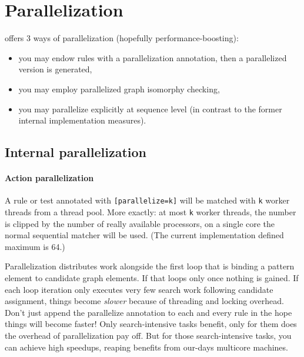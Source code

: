 \chapter{Parallelization}\label{cha:parallel} 

\GrG{} offers 3 ways of parallelization (hopefully performance-boosting):

\begin{itemize}
	\item you may endow rules with a parallelization annotation, then a parallelized version is generated, 
	\item you may employ parallelized graph isomorphy checking, 
	\item you may parallelize explicitly at sequence level (in contrast to the former internal implementation measures).
\end{itemize}


\section{Internal parallelization}\label{sec:internalparallelization}

\subsubsection*{Action parallelization}

A rule or test annotated with \texttt{[parallelize=k]} will be matched with \texttt{k} worker threads from a thread pool.
More exactly: at most \texttt{k} worker threads, the number is clipped by the number of really available processors, on a single core the normal sequential matcher will be used.
(The current implementation defined maximum is 64.)

Parallelization distributes work alongside the first loop that is binding a pattern element to candidate graph elements.
If that loops only once nothing is gained.
If each loop iteration only executes very few search work following candidate assignment,
things become \emph{slower} because of threading and locking overhead.
Don't just append the parallelize annotation to each and every rule in the hope things will become faster!
Only search-intensive tasks benefit, only for them does the overhead of parallelization pay off.
But for those search-intensive tasks, you can achieve high speedups, reaping benefits from our-days multicore machines. 


